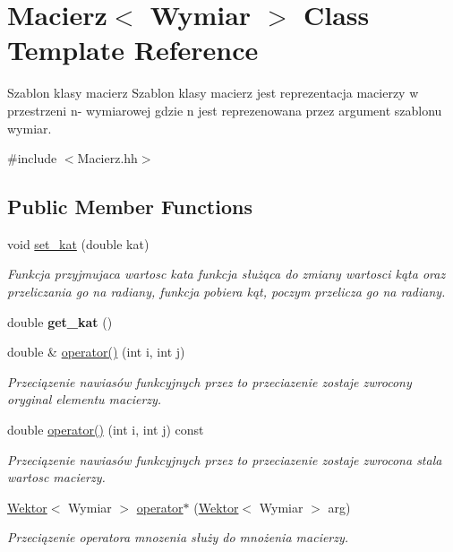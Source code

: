 \hypertarget{classMacierz}{}\section{Macierz$<$ Wymiar $>$ Class Template Reference}
\label{classMacierz}


Szablon klasy macierz Szablon klasy macierz jest reprezentacja macierzy w przestrzeni n-\/ wymiarowej gdzie n jest reprezenowana przez argument szablonu wymiar.  




{\ttfamily \#include $<$Macierz.\+hh$>$}

\subsection*{Public Member Functions}
\begin{DoxyCompactItemize}
\item 
void \hyperlink{classMacierz_ac1d682d58f77100ab13e7aa428044402}{set\+\_\+kat} (double kat)
\begin{DoxyCompactList}\small\item\em Funkcja przyjmujaca wartosc kata funkcja służąca do zmiany wartosci kąta oraz przeliczania go na radiany, funkcja pobiera kąt, poczym przelicza go na radiany. \end{DoxyCompactList}\item 
\mbox{\label{classMacierz_a260b455f5a6d1e3a61fa20d2504d36e3}} 
double {\bfseries get\+\_\+kat} ()
\item 
double \& \hyperlink{classMacierz_aea209b61651da755a99bce680fa163b6}{operator()} (int i, int j)
\begin{DoxyCompactList}\small\item\em Przeciązenie nawiasów funkcyjnych przez to przeciazenie zostaje zwrocony oryginal elementu macierzy. \end{DoxyCompactList}\item 
double \hyperlink{classMacierz_a9f2900c33177993bb0cf0ef1f467fba2}{operator()} (int i, int j) const
\begin{DoxyCompactList}\small\item\em Przeciązenie nawiasów funkcyjnych przez to przeciazenie zostaje zwrocona stala wartosc macierzy. \end{DoxyCompactList}\item 
\hyperlink{classWektor}{Wektor}$<$ Wymiar $>$ \hyperlink{classMacierz_aab7e5de48d14f25dc3e8feac77bada1e}{operator$\ast$} (\hyperlink{classWektor}{Wektor}$<$ Wymiar $>$ arg)
\begin{DoxyCompactList}\small\item\em Przeciązenie operatora mnozenia służy do mnożenia macierzy. \end{DoxyCompactList}\end{DoxyCompactItemize}


